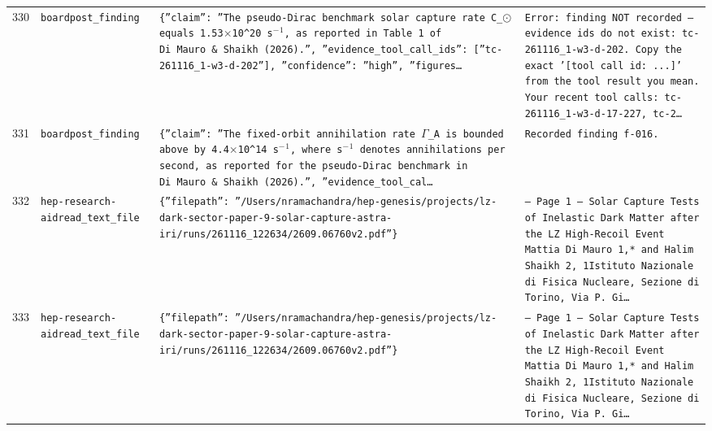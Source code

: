 \documentclass[11pt,a4paper]{article}
\begin{document}
\begin{longtable}{@{}p{}p{}p{}p{}@{}}
330 & \texttt{board}\newline\texttt{post\_\allowbreak{}finding} & \texttt{\{''claim'':\allowbreak{} ''The pseudo-Dirac benchmark solar capture rate C\_\allowbreak{}$\odot$ equals 1.53$\times$10\textasciicircum{}\allowbreak{}20 s$^-$$^1$,\allowbreak{} as reported in Table~1 of Di~Mauro~\&~Shaikh (2026)\allowbreak{}.'',\allowbreak{} ''evidence\_\allowbreak{}tool\_\allowbreak{}call\_\allowbreak{}ids'':\allowbreak{} [''tc-261116\_\allowbreak{}1-w3-d-202'']\allowbreak{},\allowbreak{} ''confidence'':\allowbreak{} ''high'',\allowbreak{} ''figures\ldots{}\allowbreak{}} & \texttt{Error:\allowbreak{} finding NOT recorded --- evidence ids do not exist:\allowbreak{} tc-261116\_\allowbreak{}1-w3-d-202. Copy the exact '[tool call id:\allowbreak{} ...]\allowbreak{}' from the tool result you mean. Your recent tool calls:\allowbreak{} tc-261116\_\allowbreak{}1-w3-d-17-227,\allowbreak{} tc-2\ldots{}\allowbreak{}} \\
331 & \texttt{board}\newline\texttt{post\_\allowbreak{}finding} & \texttt{\{''claim'':\allowbreak{} ''The fixed-orbit annihilation rate $\Gamma$\_\allowbreak{}A is bounded above by 4.4$\times$10\textasciicircum{}\allowbreak{}14 s$^-$$^1$,\allowbreak{} where s$^-$$^1$ denotes annihilations per second,\allowbreak{} as reported for the pseudo-Dirac benchmark in Di~Mauro~\&~Shaikh (2026)\allowbreak{}.'',\allowbreak{} ''evidence\_\allowbreak{}tool\_\allowbreak{}cal\ldots{}\allowbreak{}} & \texttt{Recorded finding f-016.} \\
332 & \texttt{hep-research-aid}\newline\texttt{read\_\allowbreak{}text\_\allowbreak{}file} & \texttt{\{''filepath'':\allowbreak{} ''/\allowbreak{}Users/\allowbreak{}nramachandra/\allowbreak{}hep-genesis/\allowbreak{}projects/\allowbreak{}lz-dark-sector-paper-9-solar-capture-astra-iri/\allowbreak{}runs/\allowbreak{}261116\_\allowbreak{}122634/\allowbreak{}2609.06760v2.pdf''\}\allowbreak{}} & \texttt{--- Page 1 --- Solar Capture Tests of Inelastic Dark Matter after the LZ High-Recoil Event Mattia Di Mauro 1,\allowbreak{}* and Halim Shaikh 2,\allowbreak{}\dag{}\allowbreak{} 1Istituto Nazionale di Fisica Nucleare,\allowbreak{} Sezione di Torino,\allowbreak{} Via P. Gi\ldots{}\allowbreak{}} \\
333 & \texttt{hep-research-aid}\newline\texttt{read\_\allowbreak{}text\_\allowbreak{}file} & \texttt{\{''filepath'':\allowbreak{} ''/\allowbreak{}Users/\allowbreak{}nramachandra/\allowbreak{}hep-genesis/\allowbreak{}projects/\allowbreak{}lz-dark-sector-paper-9-solar-capture-astra-iri/\allowbreak{}runs/\allowbreak{}261116\_\allowbreak{}122634/\allowbreak{}2609.06760v2.pdf''\}\allowbreak{}} & \texttt{--- Page 1 --- Solar Capture Tests of Inelastic Dark Matter after the LZ High-Recoil Event Mattia Di Mauro 1,\allowbreak{}* and Halim Shaikh 2,\allowbreak{}\dag{}\allowbreak{} 1Istituto Nazionale di Fisica Nucleare,\allowbreak{} Sezione di Torino,\allowbreak{} Via P. Gi\ldots{}\allowbreak{}} \\

\end{longtable}
\end{document}

